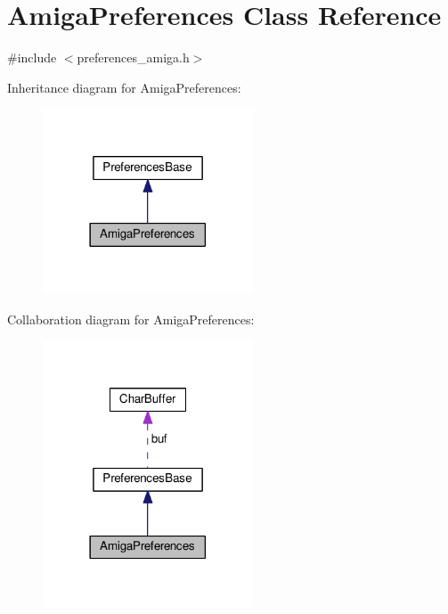 \hypertarget{classAmigaPreferences}{}\section{Amiga\+Preferences Class Reference}
\label{classAmigaPreferences}


{\ttfamily \#include $<$preferences\+\_\+amiga.\+h$>$}



Inheritance diagram for Amiga\+Preferences\+:\nopagebreak
\begin{figure}[H]
\begin{center}
\leavevmode
\includegraphics[width=177pt]{classAmigaPreferences__inherit__graph}
\end{center}
\end{figure}


Collaboration diagram for Amiga\+Preferences\+:\nopagebreak
\begin{figure}[H]
\begin{center}
\leavevmode
\includegraphics[width=177pt]{classAmigaPreferences__coll__graph}
\end{center}
\end{figure}
